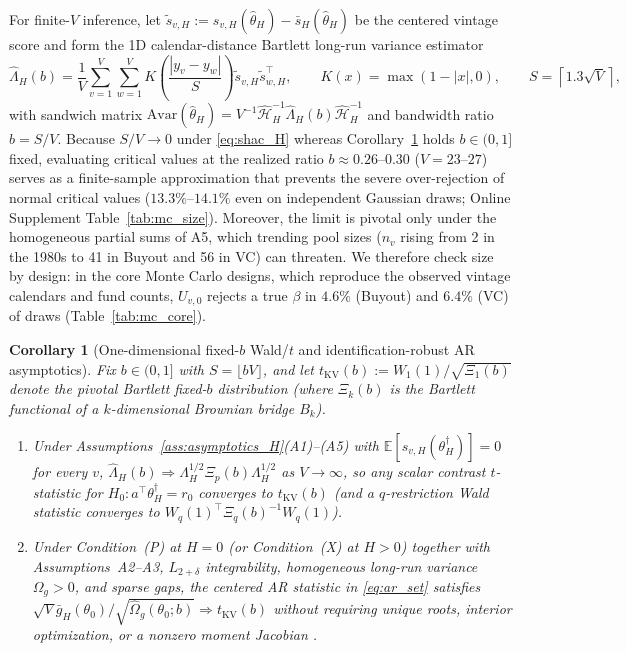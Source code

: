 \documentclass[12pt]{article}
\newtheorem{corollary}{Corollary}
\begin{document}
For finite-$V$ inference, let $\tilde{s}_{v,H} := s_{v,H}(\hat\theta_H) - \bar{s}_H(\hat\theta_H)$ be the centered vintage score and form the 1D calendar-distance Bartlett long-run variance estimator \citep{C99,KS11,LLSW18}
\begin{equation}
\label{eq:shac_H}
\hat\Lambda_H(b) = \frac{1}{V}\sum_{v=1}^V\sum_{w=1}^V K\!\left(\frac{|y_v - y_w|}{S}\right)\tilde{s}_{v,H}\tilde{s}_{w,H}^\top,
\qquad
K(x) = \max(1 - |x|, 0),
\qquad
S = \left\lceil 1.3\sqrt{V} \right\rceil,
\end{equation}
with sandwich matrix $\widehat{\mathrm{Avar}}(\hat\theta_H) = V^{-1}\hat{\mathcal{H}}_H^{-1}\hat\Lambda_H(b)\hat{\mathcal{H}}_H^{-1}$ and bandwidth ratio $b = S/V$.
Because $S/V \to 0$ under \eqref{eq:shac_H} whereas Corollary~\ref{cor:fixed_b_ar} holds $b \in (0,1]$ fixed, evaluating \citet{KV05} critical values at the realized ratio $b \approx 0.26$--$0.30$ ($V = 23$--$27$) serves as a finite-sample approximation that prevents the severe over-rejection of normal critical values ($13.3\%$--$14.1\%$ even on independent Gaussian draws; Online Supplement Table~\ref{tab:mc_size}).
Moreover, the \citet{KV05} limit is pivotal only under the homogeneous partial sums of A5, which trending pool sizes ($n_v$ rising from 2 in the 1980s to 41 in Buyout and 56 in VC) can threaten. We therefore check size by design: in the core Monte Carlo designs, which reproduce the observed vintage calendars and fund counts, $U_{v,0}$ rejects a true $\beta$ in $4.6\%$ (Buyout) and $6.4\%$ (VC) of draws (Table~\ref{tab:mc_core}).

\begin{corollary}[One-dimensional fixed-$b$ Wald/$t$ and identification-robust AR asymptotics]
\label{cor:fixed_b_ar}
Fix $b \in (0,1]$ with $S = \lfloor b V \rfloor$, and let $t_{\mathrm{KV}}(b) := W_1(1)/\sqrt{\Xi_1(b)}$ denote the pivotal \citet{KV05} Bartlett fixed-$b$ distribution (where $\Xi_k(b)$ is the Bartlett functional of a $k$-dimensional Brownian bridge $B_k$).
\begin{enumerate}
  \item[\textbf{(i)}] Under Assumptions~\ref{ass:asymptotics_H}(A1)--(A5) with $\mathbb{E}[s_{v,H}(\theta_H^\dagger)] = 0$ for every $v$, $\hat\Lambda_H(b) \Rightarrow \Lambda_H^{1/2}\Xi_p(b)\Lambda_H^{1/2}$ as $V \to \infty$, so any scalar contrast $t$-statistic for $H_0: a^\top\theta_H^\dagger = r_0$ converges to $t_{\mathrm{KV}}(b)$ (and a $q$-restriction Wald statistic converges to $W_q(1)^\top \Xi_q(b)^{-1} W_q(1)$).
  \item[\textbf{(ii)}] Under Condition~(P) at $H=0$ (or Condition~(X) at $H>0$) together with Assumptions~A2--A3, $L_{2+\delta}$ integrability, homogeneous long-run variance $\Omega_g > 0$, and sparse gaps, the centered AR statistic in \eqref{eq:ar_set} satisfies $\sqrt{V}\bar{g}_H(\theta_0)/\sqrt{\hat\Omega_g(\theta_0;b)} \Rightarrow t_{\mathrm{KV}}(b)$ without requiring unique roots, interior optimization, or a nonzero moment Jacobian \citep{AR49,SW00}.
\end{enumerate}
\end{corollary}
\end{document}
